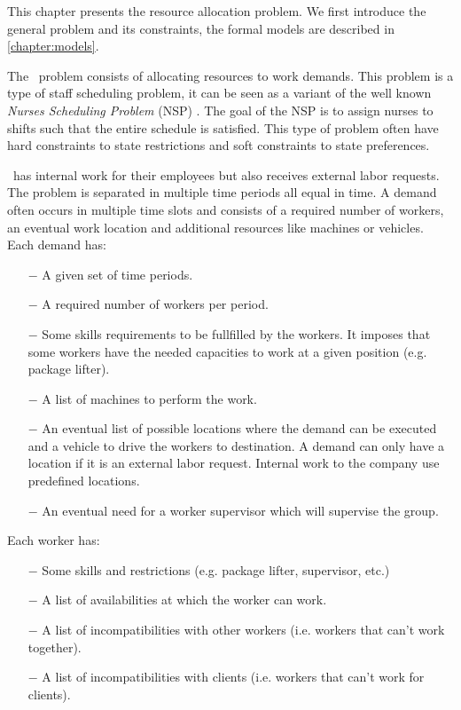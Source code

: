 \documentclass[../thesis.tex]{subfiles}
\begin{document}
This chapter presents the resource allocation problem.
We first introduce the general problem and its constraints, 
the formal models are described in \autoref{chapter:models}.

The \vone\ problem consists of allocating resources to work demands.
This problem is a type of staff scheduling problem, it can be seen as a variant of the 
well known \emph{Nurses Scheduling Problem} (NSP) \cite{Burke2004}. The goal of the NSP is to assign 
nurses to shifts such that the entire schedule is satisfied. 
This type of problem often have hard constraints to state restrictions 
and soft constraints to state preferences. 

\vone\ has internal work for their employees but also receives 
external labor requests. The problem is separated in multiple time periods all equal in time.
A demand often occurs in multiple time slots and consists of a required number of workers, an eventual 
work location and additional resources like machines or vehicles. Each demand has:

\begin{itemize}
  \item[$-$] A given set of time periods.
  \item[$-$] A required number of workers per period.
  \item[$-$] Some skills requirements to be fullfilled by the workers. 
  It imposes that some workers have the needed capacities to work at a given position (e.g. package lifter).
  \item[$-$] A list of machines to perform the work.
  \item[$-$] An eventual list of possible locations where the demand can be executed and a vehicle to drive the workers to destination.
  A demand can only have a location if it is an external labor request. Internal work to the company use predefined locations.
  \item[$-$] An eventual need for a worker supervisor which will supervise the group.
\end{itemize}


Each worker has:

\begin{itemize}
  \item[$-$] Some skills and restrictions (e.g. package lifter, supervisor, etc.)
  \item[$-$] A list of availabilities at which the worker can work.
  \item[$-$] A list of incompatibilities with other workers (i.e. workers that can't work together).
  \item[$-$] A list of incompatibilities with clients (i.e. workers that can't work for clients).
\end{itemize}
\end{document}
